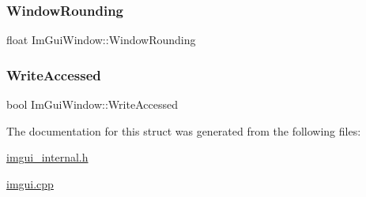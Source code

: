 \mbox{\label{struct_im_gui_window_a871ebbbfdf354600a3833c270d6e6ef4}} 
\subsubsection{\texorpdfstring{Window\+Rounding}{WindowRounding}}
{\footnotesize\ttfamily float Im\+Gui\+Window\+::\+Window\+Rounding}

\mbox{\label{struct_im_gui_window_a3c29e870f485d115e7715e149c4dfc4d}} 
\subsubsection{\texorpdfstring{Write\+Accessed}{WriteAccessed}}
{\footnotesize\ttfamily bool Im\+Gui\+Window\+::\+Write\+Accessed}



The documentation for this struct was generated from the following files\+:\begin{DoxyCompactItemize}
\item 
\mbox{\hyperlink{imgui__internal_8h}{imgui\+\_\+internal.\+h}}\item 
\mbox{\hyperlink{imgui_8cpp}{imgui.\+cpp}}\end{DoxyCompactItemize}
